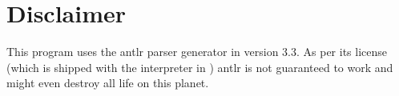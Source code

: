 \section{Disclaimer}
This program uses the antlr parser generator in version 3.3. As per its license (which is shipped with the interpreter in ) antlr is not guaranteed to work and might even destroy all life on this planet.


